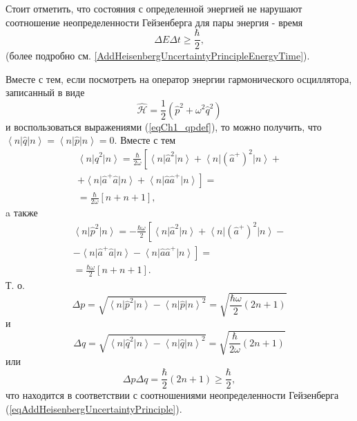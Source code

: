 \begin{remark}
  Стоит отметить, что состояния с определенной энергией не нарушают 
  соотношение неопределенности Гейзенберга для пары
  энергия - время
  \[
  \Delta E \Delta t \ge \frac{\hbar}{2},
  \]
  (более подробно
  см. \autoref{AddHeisenbergUncertaintyPrincipleEnergyTime}). 

  Вместе с тем, если посмотреть на оператор энергии гармонического
  осциллятора, записанный в виде
  \[
  \hat{\mathcal{H}} =\frac{1}{2} \left(\hat{p}^2 +
  \omega^2\hat{q}^2\right)
  \]
  и воспользоваться выражениями (\ref{eqCh1_qpdef}), то можно получить,
  что $\left<n\right|\hat{q}\left|n\right> =
  \left<n\right|\hat{p}\left|n\right> = 0$. Вместе с тем
  \begin{eqnarray}
    \left<n\right|\hat{q}^2\left|n\right> = \frac{\hbar}{2 \omega}
    \left[
      \left<n\right|\hat{a}^2\left|n\right> +
      \left<n\right|\left(\hat{a}^{+}\right)^2\left|n\right> +
      \right.
      \nonumber \\
      \left.
      +
      \left<n\right|\hat{a}^{+}\hat{a}\left|n\right> +
      \left<n\right|\hat{a}\hat{a}^{+}\left|n\right>
      \right] =
    \nonumber \\
    = \frac{\hbar}{2 \omega}
    \left[n + n + 1\right],
    \nonumber
  \end{eqnarray}
  a также
  \begin{eqnarray}
    \left<n\right|\hat{p}^2\left|n\right> = - \frac{\hbar \omega}{2}
    \left[
      \left<n\right|\hat{a}^2\left|n\right> +
      \left<n\right|\left(\hat{a}^{+}\right)^2\left|n\right> - \right.
      \nonumber \\
      \left.
      -
      \left<n\right|\hat{a}^{+}\hat{a}\left|n\right> -
      \left<n\right|\hat{a}\hat{a}^{+}\left|n\right>
      \right] =
    \nonumber \\
    = \frac{\hbar \omega}{2}
    \left[n + n + 1\right].
    \nonumber
  \end{eqnarray}
  Т. о.
  \[
  \Delta p = \sqrt{\left<n\right|\hat{p}^2\left|n\right> -
    \left<n\right|\hat{p}\left|n\right>^2} =
  \sqrt{\frac{\hbar \omega}{2}\left(2n + 1\right)}
  \]
  и
  \[
  \Delta q = \sqrt{\left<n\right|\hat{q}^2\left|n\right> -
    \left<n\right|\hat{q}\left|n\right>^2} =
  \sqrt{\frac{\hbar}{2\omega}\left(2n + 1\right)}
  \]
  или
  \[
  \Delta p \Delta q = \frac{\hbar}{2}\left(2n + 1\right) \ge \frac{\hbar}{2},
  \]
  что находится в соответствии с соотношениями неопределенности
  Гейзенберга (\ref{eqAddHeisenbergUncertaintyPrinciple}).


\end{remark}
